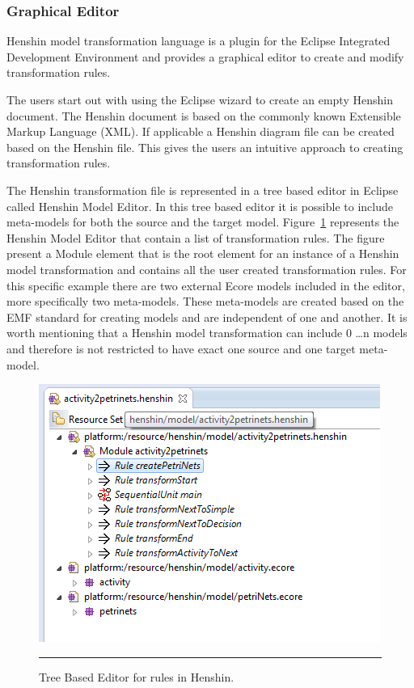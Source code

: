 \subsubsection*{Graphical Editor}
Henshin model transformation language is a plugin for the Eclipse
Integrated Development Environment\cite{Eclipse} and provides a graphical
editor to create and modify transformation rules. 

The users start out with using the Eclipse wizard to create an empty Henshin
document. The Henshin document is based on the commonly known Extensible Markup
Language (XML)\cite{XML}. If applicable a Henshin diagram file can be created
based on the Henshin file. This gives the users an intuitive approach to
creating transformation rules.

The Henshin transformation file is represented in a tree based editor in
Eclipse called Henshin Model Editor. In this tree based editor it is possible
to include meta-models for both the source and the target model.
Figure~\ref{fig:Henshin_TreeEditor} represents the Henshin Model Editor that
contain a list of transformation rules. The figure present a Module element
that is the root element for an instance of a Henshin model transformation and
contains all the user created transformation rules. For this specific example
there are two external Ecore models included in the editor, more specifically
two meta-models. These meta-models are created based on the EMF standard for
creating models and are independent of one and another. It is worth mentioning
that a Henshin model transformation can include 0 \ldots n models and therefore
is not restricted to have exact one source and one target meta-model.  

\begin{figure}[H]
	\centering
	\includegraphics[scale=0.7]{figures/Henshin_TreeEdtiro.png}
	\rule{35em}{0.5pt}
	\caption[The Henshin Model Editor]
	{Tree Based Editor for rules in Henshin.}
	\label{fig:Henshin_TreeEditor}
\end{figure}

